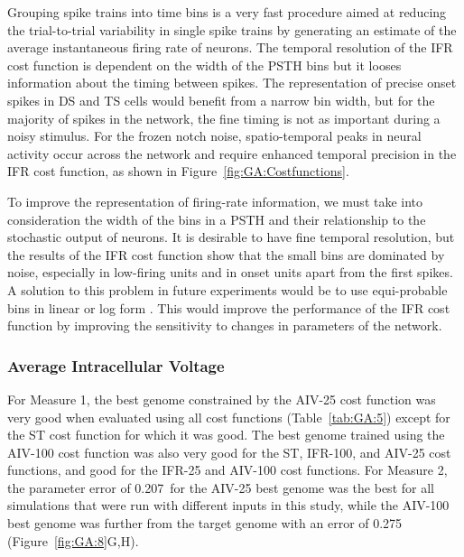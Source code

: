 \smallskip{}

Grouping spike trains into time bins is a very fast procedure aimed at
reducing the trial-to-trial variability in single spike trains by
generating an estimate of the average instantaneous firing rate of
neurons. The temporal resolution of the IFR cost function is dependent on
the width of the PSTH bins but it looses information about the timing
between spikes.  The representation of precise onset spikes in DS and TS
cells would benefit from a narrow bin width, but for the majority of spikes
in the network, the fine timing is not as important during a noisy
stimulus.  For the frozen notch noise, spatio-temporal peaks in neural
activity occur across the network and require enhanced temporal precision
in the IFR cost function, as shown in Figure~\ref{fig:GA:Costfunctions}.

\smallskip{}

To improve the representation of firing-rate information, we must take into
consideration the width of the bins in a PSTH and their relationship to the
stochastic output of neurons.  It is desirable to have fine temporal
resolution, but the results of the IFR cost function show that the small
bins are dominated by noise, especially in low-firing units and in onset
units apart from the first spikes. A solution to this problem in future
experiments would be to use equi-probable bins in linear or log form
\citep{BhumbraInyushkinEtAl:2004}.  This would improve the performance of
the IFR cost function by improving the sensitivity to changes in parameters
of the network.

\subsubsection{Average Intracellular Voltage}\label{sec:GA:aver-intr-volt-summ}

For Measure 1, the best genome constrained by the AIV-25 cost function was
very good when evaluated using all cost functions (Table~\ref{tab:GA:5})
except for the ST cost function for which it was good. The best genome
trained using the AIV-100 cost function was also very good for the ST,
IFR-100, and AIV-25 cost functions, and good for the IFR-25 and AIV-100
cost functions.  %
For Measure 2, the parameter error of 0.207~for the AIV-25 best genome was the
best for all {\GA} simulations that were run with different inputs in this study,
while the AIV-100 best genome was further from the target genome with an error
of 0.275 (Figure~\ref{fig:GA:8}G,H).

